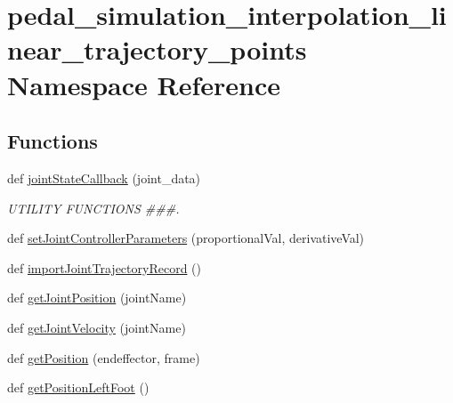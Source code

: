 \hypertarget{namespacepedal__simulation__interpolation__linear__trajectory__points}{}\section{pedal\+\_\+simulation\+\_\+interpolation\+\_\+linear\+\_\+trajectory\+\_\+points Namespace Reference}
\label{namespacepedal__simulation__interpolation__linear__trajectory__points}
\subsection*{Functions}
\begin{DoxyCompactItemize}
\item 
def \mbox{\hyperlink{namespacepedal__simulation__interpolation__linear__trajectory__points_a34fd0c8e437253db31d7df2ae69a52aa}{joint\+State\+Callback}} (joint\+\_\+data)
\begin{DoxyCompactList}\small\item\em U\+T\+I\+L\+I\+TY F\+U\+N\+C\+T\+I\+O\+NS \#\#\#. \end{DoxyCompactList}\item 
def \mbox{\hyperlink{namespacepedal__simulation__interpolation__linear__trajectory__points_a9e2d0e6c755b25949d26f531662766b3}{set\+Joint\+Controller\+Parameters}} (proportional\+Val, derivative\+Val)
\item 
def \mbox{\hyperlink{namespacepedal__simulation__interpolation__linear__trajectory__points_afa0031bbb7e988157c3978c77909c9f3}{import\+Joint\+Trajectory\+Record}} ()
\item 
def \mbox{\hyperlink{namespacepedal__simulation__interpolation__linear__trajectory__points_ab795561d31a73377693ae3df6ad51304}{get\+Joint\+Position}} (joint\+Name)
\item 
def \mbox{\hyperlink{namespacepedal__simulation__interpolation__linear__trajectory__points_a52f9b10a639d512975b928adace6f31b}{get\+Joint\+Velocity}} (joint\+Name)
\item 
def \mbox{\hyperlink{namespacepedal__simulation__interpolation__linear__trajectory__points_a8c9e3f7ebe2d661e153d4d63eeb804fc}{get\+Position}} (endeffector, frame)
\item 
def \mbox{\hyperlink{namespacepedal__simulation__interpolation__linear__trajectory__points_a1334cc54f77770d48e6410fe09960aa7}{get\+Position\+Left\+Foot}} ()
\item 

\end{DoxyCompactItemize}
